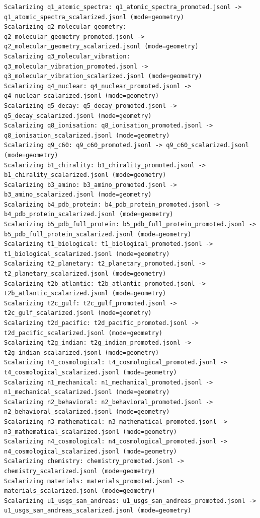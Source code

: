 \documentclass[11pt, letterpaper, openany]{book}
\begin{document}
\begin{empiricalbox}
\begin{lstlisting}[style=terminal]
Scalarizing q1_atomic_spectra: q1_atomic_spectra_promoted.jsonl -> q1_atomic_spectra_scalarized.jsonl (mode=geometry)
Scalarizing q2_molecular_geometry: q2_molecular_geometry_promoted.jsonl -> q2_molecular_geometry_scalarized.jsonl (mode=geometry)
Scalarizing q3_molecular_vibration: q3_molecular_vibration_promoted.jsonl -> q3_molecular_vibration_scalarized.jsonl (mode=geometry)
Scalarizing q4_nuclear: q4_nuclear_promoted.jsonl -> q4_nuclear_scalarized.jsonl (mode=geometry)
Scalarizing q5_decay: q5_decay_promoted.jsonl -> q5_decay_scalarized.jsonl (mode=geometry)
Scalarizing q8_ionisation: q8_ionisation_promoted.jsonl -> q8_ionisation_scalarized.jsonl (mode=geometry)
Scalarizing q9_c60: q9_c60_promoted.jsonl -> q9_c60_scalarized.jsonl (mode=geometry)
Scalarizing b1_chirality: b1_chirality_promoted.jsonl -> b1_chirality_scalarized.jsonl (mode=geometry)
Scalarizing b3_amino: b3_amino_promoted.jsonl -> b3_amino_scalarized.jsonl (mode=geometry)
Scalarizing b4_pdb_protein: b4_pdb_protein_promoted.jsonl -> b4_pdb_protein_scalarized.jsonl (mode=geometry)
Scalarizing b5_pdb_full_protein: b5_pdb_full_protein_promoted.jsonl -> b5_pdb_full_protein_scalarized.jsonl (mode=geometry)
Scalarizing t1_biological: t1_biological_promoted.jsonl -> t1_biological_scalarized.jsonl (mode=geometry)
Scalarizing t2_planetary: t2_planetary_promoted.jsonl -> t2_planetary_scalarized.jsonl (mode=geometry)
Scalarizing t2b_atlantic: t2b_atlantic_promoted.jsonl -> t2b_atlantic_scalarized.jsonl (mode=geometry)
Scalarizing t2c_gulf: t2c_gulf_promoted.jsonl -> t2c_gulf_scalarized.jsonl (mode=geometry)
Scalarizing t2d_pacific: t2d_pacific_promoted.jsonl -> t2d_pacific_scalarized.jsonl (mode=geometry)
Scalarizing t2g_indian: t2g_indian_promoted.jsonl -> t2g_indian_scalarized.jsonl (mode=geometry)
Scalarizing t4_cosmological: t4_cosmological_promoted.jsonl -> t4_cosmological_scalarized.jsonl (mode=geometry)
Scalarizing n1_mechanical: n1_mechanical_promoted.jsonl -> n1_mechanical_scalarized.jsonl (mode=geometry)
Scalarizing n2_behavioral: n2_behavioral_promoted.jsonl -> n2_behavioral_scalarized.jsonl (mode=geometry)
Scalarizing n3_mathematical: n3_mathematical_promoted.jsonl -> n3_mathematical_scalarized.jsonl (mode=geometry)
Scalarizing n4_cosmological: n4_cosmological_promoted.jsonl -> n4_cosmological_scalarized.jsonl (mode=geometry)
Scalarizing chemistry: chemistry_promoted.jsonl -> chemistry_scalarized.jsonl (mode=geometry)
Scalarizing materials: materials_promoted.jsonl -> materials_scalarized.jsonl (mode=geometry)
Scalarizing u1_usgs_san_andreas: u1_usgs_san_andreas_promoted.jsonl -> u1_usgs_san_andreas_scalarized.jsonl (mode=geometry)

\end{lstlisting}
\end{empiricalbox}
\end{document}
